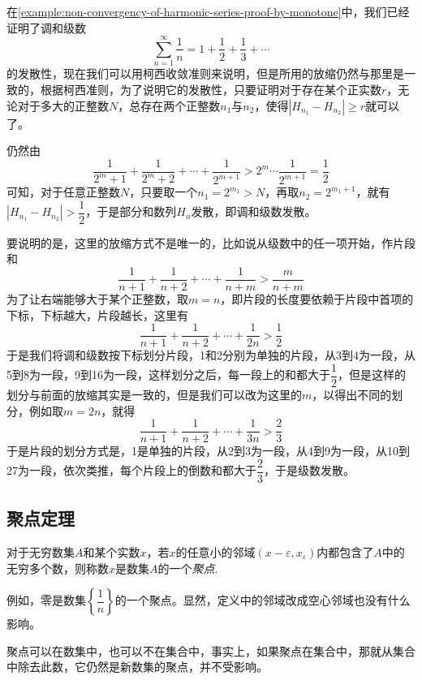 \begin{example}[调和级数的发散性]
  \label{example:non-convergency-of-harmonic-series-proof-by-cauchy}
  在\autoref{example:non-convergency-of-harmonic-series-proof-by-monotone}中，我们已经证明了调和级数
  \[ \sum_{n=1}^{\infty} \frac{1}{n} = 1+\frac{1}{2} + \frac{1}{3} + \cdots  \]
  的发散性，现在我们可以用柯西收敛准则来说明，但是所用的放缩仍然与那里是一致的，根据柯西准则，为了说明它的发散性，只要证明对于存在某个正实数$r$，无论对于多大的正整数$N$，总存在两个正整数$n_1$与$n_2$，使得$|H_{n_1}-H_{n_2}|\geqslant r$就可以了。

  仍然由
  \[ \frac{1}{2^m+1} + \frac{1}{2^m+2} + \cdots + \frac{1}{2^{m+1}} > 2^m \cdots \frac{1}{2^{m+1}} = \frac{1}{2} \]
可知，对于任意正整数$N$，只要取一个$n_1=2^{m_1}>N$，再取$n_2=2^{m_1+1}$，就有$|H_{n_1}-H_{n_2}|>\dfrac{1}{2}$，于是部分和数列$H_n$发散，即调和级数发散。

要说明的是，这里的放缩方式不是唯一的，比如说从级数中的任一项开始，作片段和
\[ \frac{1}{n+1} + \frac{1}{n+2} + \cdots + \frac{1}{n+m} > \frac{m}{n+m} \]
为了让右端能够大于某个正整数，取$m=n$，即片段的长度要依赖于片段中首项的下标，下标越大，片段越长，这里有
\[ \frac{1}{n+1} + \frac{1}{n+2} + \cdots + \frac{1}{2n} > \frac{1}{2} \]
于是我们将调和级数按下标划分片段，1和2分别为单独的片段，从3到4为一段，从5到8为一段，9到16为一段，这样划分之后，每一段上的和都大于$\dfrac{1}{2}$，但是这样的划分与前面的放缩其实是一致的，但是我们可以改为这里的$m$，以得出不同的划分，例如取$m=2n$，就得
\[ \frac{1}{n+1} + \frac{1}{n+2} + \cdots + \frac{1}{3n} > \frac{2}{3} \]
于是片段的划分方式是，1是单独的片段，从2到3为一段，从4到9为一段，从10到27为一段，依次类推，每个片段上的倒数和都大于$\dfrac{2}{3}$，于是级数发散。
\end{example}

\subsection{聚点定理}
\label{sec:accumulate-point-theorem}

\begin{definition}
  对于无穷数集$A$和某个实数$x$，若$x$的任意小的邻域$(x-\varepsilon,x_{\varepsilon})$内都包含了$A$中的无穷多个数，则称数$x$是数集$A$的一个\emph{聚点}.
\end{definition}

例如，零是数集$\left\{ \dfrac{1}{n} \right\}$的一个聚点。显然，定义中的邻域改成空心邻域也没有什么影响。

聚点可以在数集中，也可以不在集合中，事实上，如果聚点在集合中，那就从集合中除去此数，它仍然是新数集的聚点，并不受影响。

